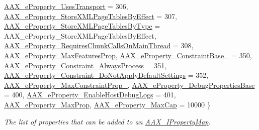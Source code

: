 \begin{DoxyCompactItemize}
\newline
\mbox{\hyperlink{a00662_a13e384f22825afd3db6d68395b79ce0daf3e1162c5f517595589d513d48158dbd}{A\+A\+X\+\_\+e\+Property\+\_\+\+Uses\+Transport}} = 306, 
\mbox{\hyperlink{a00662_a13e384f22825afd3db6d68395b79ce0da1837e77c3a427004ac44714a8c9cbad9}{A\+A\+X\+\_\+e\+Property\+\_\+\+Store\+X\+M\+L\+Page\+Tables\+By\+Effect}} = 307, 
\mbox{\hyperlink{a00662_a13e384f22825afd3db6d68395b79ce0dae555ac90959bcee0301eed22dff52b03}{A\+A\+X\+\_\+e\+Property\+\_\+\+Store\+X\+M\+L\+Page\+Tables\+By\+Type}} = A\+A\+X\+\_\+e\+Property\+\_\+\+Store\+X\+M\+L\+Page\+Tables\+By\+Effect, 
\mbox{\hyperlink{a00662_a13e384f22825afd3db6d68395b79ce0da01bd38243e95666d55b80e79bc13c5cb}{A\+A\+X\+\_\+e\+Property\+\_\+\+Requires\+Chunk\+Calls\+On\+Main\+Thread}} = 308, 
\newline
\mbox{\hyperlink{a00662_a13e384f22825afd3db6d68395b79ce0da774156371370524c7f506d334d0fa251}{A\+A\+X\+\_\+e\+Property\+\_\+\+Max\+Features\+Prop}}, 
\mbox{\hyperlink{a00662_a13e384f22825afd3db6d68395b79ce0da979c0a2eb5859ec416705f5be73e98e8}{A\+A\+X\+\_\+e\+Property\+\_\+\+Constraint\+Base\+\_}} = 350, 
\mbox{\hyperlink{a00662_a13e384f22825afd3db6d68395b79ce0da510e79713c2f14ebb0a50ed2ab0ff679}{A\+A\+X\+\_\+e\+Property\+\_\+\+Constraint\+\_\+\+Always\+Process}} = 351, 
\mbox{\hyperlink{a00662_a13e384f22825afd3db6d68395b79ce0da80bb55dbba6cba01120eda8f86284eba}{A\+A\+X\+\_\+e\+Property\+\_\+\+Constraint\+\_\+\+Do\+Not\+Apply\+Default\+Settings}} = 352, 
\newline
\mbox{\hyperlink{a00662_a13e384f22825afd3db6d68395b79ce0da431a4d1a95b1e893c4e69ea9d49b661f}{A\+A\+X\+\_\+e\+Property\+\_\+\+Max\+Constraint\+Prop\+\_}}, 
\mbox{\hyperlink{a00662_a13e384f22825afd3db6d68395b79ce0daa98a41d1b3720bc6a57262995482502a}{A\+A\+X\+\_\+e\+Property\+\_\+\+Debug\+Properties\+Base}} = 400, 
\mbox{\hyperlink{a00662_a13e384f22825afd3db6d68395b79ce0da9b39f1a8eeedaf0cef06937747b96d9b}{A\+A\+X\+\_\+e\+Property\+\_\+\+Enable\+Host\+Debug\+Logs}} = 401, 
\mbox{\hyperlink{a00662_a13e384f22825afd3db6d68395b79ce0dad8e694d446978f7901cd89876b6c9d1a}{A\+A\+X\+\_\+e\+Property\+\_\+\+Max\+Prop}}, 
\newline
\mbox{\hyperlink{a00662_a13e384f22825afd3db6d68395b79ce0da1ce11eb75ad3037a91f2e97131ab37b8}{A\+A\+X\+\_\+e\+Property\+\_\+\+Max\+Cap}} = 10000
 \}
\begin{DoxyCompactList}\small\item\em The list of properties that can be added to an \mbox{\hyperlink{a01869}{A\+A\+X\+\_\+\+I\+Property\+Map}}. \end{DoxyCompactList}\end{DoxyCompactItemize}
